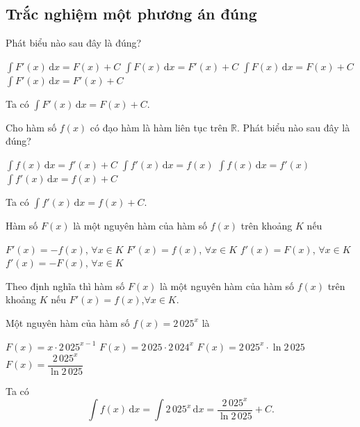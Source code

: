 \documentclass[12pt,aspectratio=169]{beamer}
\begin{document}
\subsection{Trắc nghiệm một phương án đúng}

\begin{tracnghiem}%
	Phát biểu nào sau đây là đúng?

	\choice
		{\True $\displaystyle\int F'(x) \mathrm{\,d} x=F(x)+C$}
		{$\displaystyle\int F(x) \mathrm{\,d} x=F'(x)+C$}
		{$\displaystyle\int F(x) \mathrm{\,d} x=F(x)+C$}
		{$\displaystyle\int F'(x) \mathrm{\,d} x=F'(x)+C$}

	\begin{loigiai}
			Ta có $\displaystyle\int F'(x) \mathrm{\,d} x=F(x)+C$.
	\end{loigiai}
\end{tracnghiem}

\begin{tracnghiem}%
	Cho hàm số $f(x)$ có đạo hàm là hàm liên tục trên $\mathbb{R}$. Phát biểu nào sau đây là đúng?

	\choice
		{$\displaystyle\int f(x) \mathrm{\,d}x=f'(x)+C$}
		{$\displaystyle\int f'(x) \mathrm{\,d}x=f(x)$}
		{$\displaystyle\int f(x) \mathrm{\,d}x=f'(x)$}
		{\True $\displaystyle\int f'(x) \mathrm{\,d}x=f(x)+C$}

	\begin{loigiai}
			Ta có $\displaystyle\int f'(x) \mathrm{\,d}x=f(x)+C$.
	\end{loigiai}
\end{tracnghiem}

\begin{tracnghiem}%
	Hàm số $F(x)$ là một nguyên hàm của hàm số $f(x)$ trên khoảng $K$ nếu

	\choice
		{$F'(x)=-f(x)$, $\forall x \in K$}
		{\True $F'(x)=f(x)$, $\forall x \in K$}
		{$f'(x)=F(x)$, $\forall x \in K$}
		{$f'(x)=-F(x)$, $\forall x \in K$}

	\begin{loigiai}
			Theo định nghĩa thì hàm số $F(x)$ là một nguyên hàm của hàm số $f(x)$ trên khoảng $K$ nếu $F'(x)=f(x)$,$\forall x \in K$.
	\end{loigiai}
\end{tracnghiem}

\begin{tracnghiem}%
	Một nguyên hàm của hàm số $f(x)=2\,025^x$ là

	\choice
		{$F(x)=x \cdot 2\,025^{x-1}$}
		{$F(x)=2\,025 \cdot 2\,024^x$}
		{$F(x)=2\,025^x \cdot \ln 2\,025$}
		{\True $F(x)=\dfrac{2\,025^x}{\ln 2\,025}$}

	\begin{loigiai}
			Ta có
			\[\displaystyle\int f(x)\mathrm{\,d}x=\displaystyle\int 2\,025^x\mathrm{\,d}x=\dfrac{2\,025^x}{\ln 2\,025}+C.\]
	\end{loigiai}
\end{tracnghiem}
\end{document}
